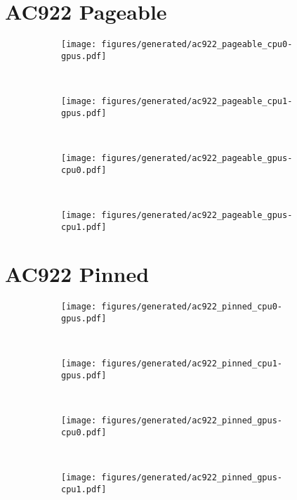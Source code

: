 \section{AC922 Pageable}

\begin{figure}[H]
    \centering
    \begin{subfigure}[b]{0.45\textwidth}
        \texttt{[image: figures/generated/ac922\_pageable\_cpu0-gpus.pdf]}
        \caption{}
        \label{}
    \end{subfigure}
    ~
    \begin{subfigure}[b]{0.45\textwidth}
        \texttt{[image: figures/generated/ac922\_pageable\_cpu1-gpus.pdf]}
        \caption{}
        \label{}
    \end{subfigure}
    \\
    \begin{subfigure}[b]{0.45\textwidth}
        \texttt{[image: figures/generated/ac922\_pageable\_gpus-cpu0.pdf]}
        \caption{}
        \label{}
    \end{subfigure}
    ~
    \begin{subfigure}[b]{0.45\textwidth}
        \texttt{[image: figures/generated/ac922\_pageable\_gpus-cpu1.pdf]}
        \caption{}
        \label{}
    \end{subfigure}
    \caption[]{}
    \label{fig:data-ac922-pageable}
\end{figure}

\section{AC922 Pinned}

\begin{figure}[H]
    \centering
    \begin{subfigure}[b]{0.45\textwidth}
        \texttt{[image: figures/generated/ac922\_pinned\_cpu0-gpus.pdf]}
        \caption{}
        \label{}
    \end{subfigure}
    ~
    \begin{subfigure}[b]{0.45\textwidth}
        \texttt{[image: figures/generated/ac922\_pinned\_cpu1-gpus.pdf]}
        \caption{}
        \label{}
    \end{subfigure}
    \\
    \begin{subfigure}[b]{0.45\textwidth}
        \texttt{[image: figures/generated/ac922\_pinned\_gpus-cpu0.pdf]}
        \caption{}
        \label{}
    \end{subfigure}
    ~
    \begin{subfigure}[b]{0.45\textwidth}
        \texttt{[image: figures/generated/ac922\_pinned\_gpus-cpu1.pdf]}
        \caption{}
        \label{}
    \end{subfigure}
    \caption[]{}
    \label{fig:data-ac922-pinned}
\end{figure}

